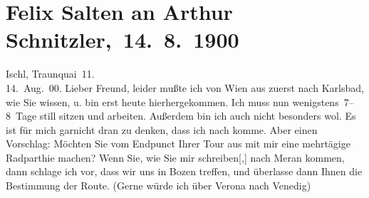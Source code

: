 

         
         \renewcommand{\erwaehntePersonen}{Personen: Oskar Mayer, Felix Salten}
         \renewcommand{\erwaehnteOrte}{Orte: Ala, Bad Ischl, Bludenz, Bozen, Innsbruck, Karlsbad, Meran, Schruns, Schweiz, Traunkai, Triest, Venedig, Verona, Wien}
         \renewcommand{\erwaehnteWerke}{}
               \section[ Felix Salten an Arthur Schnitzler, 14. 8. 1900]{ Felix Salten an Arthur Schnitzler, 14. 8. 1900}\nopagebreak{}\rehead{ }\begin{ledgroupsized}[t]{13cm}\normalsize\beginnumbering{} \toendnotes[C]{\smallbreak\pagebreak[2]} 
\toendnotes[C]{\smallbreak}\pstart
           \raggedleft{}{\pb}Ischl, Traunquai 11. {\\}14. Aug. 00.\pend
           \pstart
           Lieber Freund, leider mußte ich von Wien aus zuerst nach Karlsbad, wie Sie
               wissen, u. bin erst heute hierhergekommen. Ich muss
               nun wenigstens 7–8 Tage still sitzen und arbeiten. Außerdem bin ich auch nicht
               besonders wol. Es ist für mich garnicht dran zu denken, dass ich nach \label{K_L03310-1v}\label{K_L03310-1h} komme. Aber einen Vorschlag: Möchten Sie vom Endpunct Ihrer Tour aus mit mir
               eine mehrtägige Radparthie machen? Wenn Sie, wie Sie mir
                  schreiben{[},{]} nach Meran
               kommen, dann schlage ich vor, dass wir uns in Bozen treffen, und überlasse dann Ihnen die Bestimmung der Route. (Gerne {\pb}würde ich über Verona nach Venedig)

\end{ledgroupsized}
